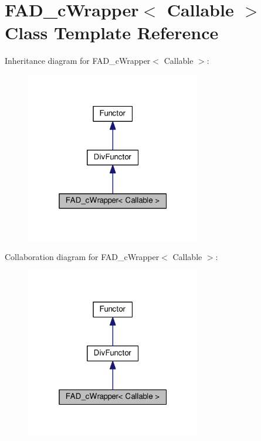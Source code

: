 \hypertarget{classFAD__cWrapper}{}\section{F\+A\+D\+\_\+c\+Wrapper$<$ Callable $>$ Class Template Reference}
\label{classFAD__cWrapper}


Inheritance diagram for F\+A\+D\+\_\+c\+Wrapper$<$ Callable $>$\+:\nopagebreak
\begin{figure}[H]
\begin{center}
\leavevmode
\includegraphics[width=217pt]{classFAD__cWrapper__inherit__graph}
\end{center}
\end{figure}


Collaboration diagram for F\+A\+D\+\_\+c\+Wrapper$<$ Callable $>$\+:\nopagebreak
\begin{figure}[H]
\begin{center}
\leavevmode
\includegraphics[width=217pt]{classFAD__cWrapper__coll__graph}
\end{center}
\end{figure}
